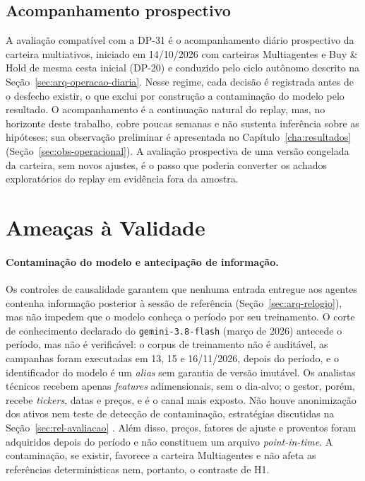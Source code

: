 \documentclass{eic-bcc-tcc}
\begin{document}
\subsection{Acompanhamento prospectivo}

A avaliação compatível com a DP-31 é o acompanhamento diário prospectivo da carteira multiativos, iniciado em 14/10/2026 com carteiras Multiagentes e Buy \& Hold de mesma cesta inicial (DP-20) e conduzido pelo ciclo autônomo descrito na Seção~\ref{sec:arq-operacao-diaria}. Nesse regime, cada decisão é registrada antes de o desfecho existir, o que exclui por construção a contaminação do modelo pelo resultado. O acompanhamento é a continuação natural do replay, mas, no horizonte deste trabalho, cobre poucas semanas e não sustenta inferência sobre as hipóteses; sua observação preliminar é apresentada no Capítulo~\ref{cha:resultados} (Seção~\ref{sec:obs-operacional}). A avaliação prospectiva de uma versão congelada da carteira, sem novos ajustes, é o passo que poderia converter os achados exploratórios do replay em evidência fora da amostra.

\section{Ameaças à Validade}
\label{sec:met-ameacas}

\paragraph{Contaminação do modelo e antecipação de informação.} Os controles de causalidade garantem que nenhuma entrada entregue aos agentes contenha informação posterior à sessão de referência (Seção~\ref{sec:arq-relogio}), mas não impedem que o modelo conheça o período por seu treinamento. O corte de conhecimento declarado do \texttt{gemini-3.8-flash} (março de 2026) antecede o período, mas não é verificável: o corpus de treinamento não é auditável, as campanhas foram executadas em 13, 15 e 16/11/2026, depois do período, e o identificador do modelo é um \textit{alias} sem garantia de versão imutável. Os analistas técnicos recebem apenas \textit{features} adimensionais, sem o dia-alvo; o gestor, porém, recebe \textit{tickers}, datas e preços, e é o canal mais exposto. Não houve anonimização dos ativos nem teste de detecção de contaminação, estratégias discutidas na Seção~\ref{sec:rel-avaliacao} \citep{Glasserman2023, Golchin2024, Drinkall2024}. Além disso, preços, fatores de ajuste e proventos foram adquiridos depois do período e não constituem um arquivo \textit{point-in-time}. A contaminação, se existir, favorece a carteira Multiagentes e não afeta as referências determinísticas nem, portanto, o contraste de H1.
\end{document}
